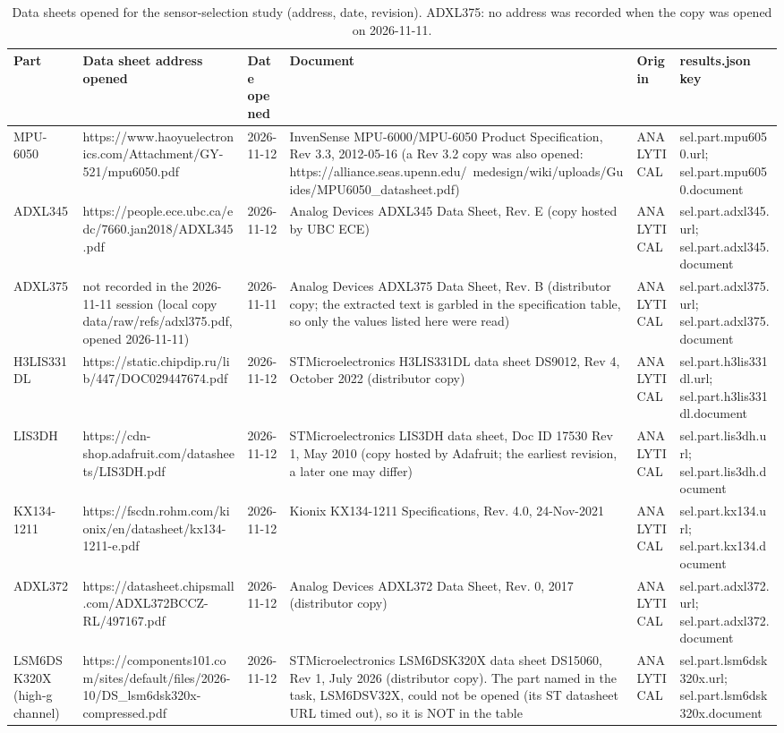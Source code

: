 \begin{table}[t]
\centering
\small
\caption{Data sheets opened for the sensor-selection study (address, date, revision). ADXL375: no address was recorded when the copy was opened on 2026-11-11.}
\label{tab:tab_sel_sources}
\begin{tabular}{llllll}
\toprule
Part & Data sheet address opened & Date opened & Document & Origin & results.json key \\
\midrule
MPU-6050 & https://www.haoyuelectronics.com/Attachment/GY-521/mpu6050.pdf & 2026-11-12 & InvenSense MPU-6000/MPU-6050 Product Specification, Rev 3.3, 2012-05-16 (a Rev 3.2 copy was also opened: https://alliance.seas.upenn.edu/~medesign/wiki/uploads/Guides/MPU6050\_datasheet.pdf) & ANALYTICAL & sel.part.mpu6050.url; sel.part.mpu6050.document \\
ADXL345 & https://people.ece.ubc.ca/edc/7660.jan2018/ADXL345.pdf & 2026-11-12 & Analog Devices ADXL345 Data Sheet, Rev. E (copy hosted by UBC ECE) & ANALYTICAL & sel.part.adxl345.url; sel.part.adxl345.document \\
ADXL375 & not recorded in the 2026-11-11 session (local copy data/raw/refs/adxl375.pdf, opened 2026-11-11) & 2026-11-11 & Analog Devices ADXL375 Data Sheet, Rev. B (distributor copy; the extracted text is garbled in the specification table, so only the values listed here were read) & ANALYTICAL & sel.part.adxl375.url; sel.part.adxl375.document \\
H3LIS331DL & https://static.chipdip.ru/lib/447/DOC029447674.pdf & 2026-11-12 & STMicroelectronics H3LIS331DL data sheet DS9012, Rev 4, October 2022 (distributor copy) & ANALYTICAL & sel.part.h3lis331dl.url; sel.part.h3lis331dl.document \\
LIS3DH & https://cdn-shop.adafruit.com/datasheets/LIS3DH.pdf & 2026-11-12 & STMicroelectronics LIS3DH data sheet, Doc ID 17530 Rev 1, May 2010 (copy hosted by Adafruit; the earliest revision, a later one may differ) & ANALYTICAL & sel.part.lis3dh.url; sel.part.lis3dh.document \\
KX134-1211 & https://fscdn.rohm.com/kionix/en/datasheet/kx134-1211-e.pdf & 2026-11-12 & Kionix KX134-1211 Specifications, Rev. 4.0, 24-Nov-2021 & ANALYTICAL & sel.part.kx134.url; sel.part.kx134.document \\
ADXL372 & https://datasheet.chipsmall.com/ADXL372BCCZ-RL/497167.pdf & 2026-11-12 & Analog Devices ADXL372 Data Sheet, Rev. 0, 2017 (distributor copy) & ANALYTICAL & sel.part.adxl372.url; sel.part.adxl372.document \\
LSM6DSK320X (high-g channel) & https://components101.com/sites/default/files/2026-10/DS\_lsm6dsk320x-compressed.pdf & 2026-11-12 & STMicroelectronics LSM6DSK320X data sheet DS15060, Rev 1, July 2026 (distributor copy). The part named in the task, LSM6DSV32X, could not be opened (its ST datasheet URL timed out), so it is NOT in the table & ANALYTICAL & sel.part.lsm6dsk320x.url; sel.part.lsm6dsk320x.document \\
\bottomrule
\end{tabular}
\end{table}
